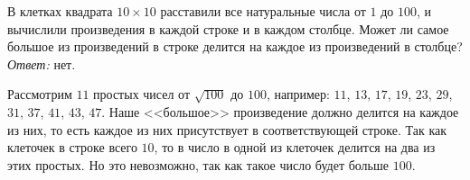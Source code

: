 \problem
В клетках квадрата $10 \times 10$ расставили все натуральные числа от $1$ до
$100$, и вычислили произведения в каждой строке и в каждом столбце.
Может ли самое большое из произведений в строке делится на каждое из
произведений в столбце?
\solution
\emph{Ответ:} нет.
\par
Рассмотрим $11$ простых чисел от $\sqrt{100}$ до $100$, например:
$11$, $13$, $17$, $19$, $23$, $29$, $31$, $37$, $41$, $43$, $47$.
Наше <<большое>> произведение должно делится на каждое из них, то есть каждое из
них присутствует в соответствующей строке.
Так как клеточек в строке всего $10$, то в число в одной из клеточек делится на
два из этих простых.
Но это невозможно, так как такое число будет больше $100$.
\endproblem
